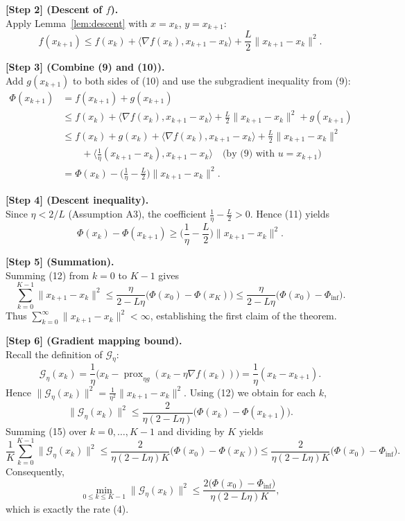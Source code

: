 \documentclass{article}
\newcommand{\prox}{\operatorname{prox}}
\newcommand{\grad}{\nabla}
\begin{document}
\bigskip
\noindent\textbf{[Step 2] (Descent of $f$).}\\
Apply Lemma~\ref{lem:descent} with $x=x_k$, $y=x_{k+1}$:
\[
f(x_{k+1})\le f(x_k)+\langle\grad f(x_k),x_{k+1}-x_k\rangle+\frac{L}{2}\|x_{k+1}-x_k\|^2.
\tag{10}
\]

\bigskip
\noindent\textbf{[Step 3] (Combine (9) and (10)).}\\
Add $g(x_{k+1})$ to both sides of (10) and use the subgradient inequality from (9):
\[
\begin{aligned}
\Phi(x_{k+1})
&=f(x_{k+1})+g(x_{k+1})\\
&\le f(x_k)+\langle\grad f(x_k),x_{k+1}-x_k\rangle+\frac{L}{2}\|x_{k+1}-x_k\|^2
   +g(x_{k+1})\\
&\le f(x_k)+g(x_k)+\Big\langle\grad f(x_k),x_{k+1}-x_k\Big\rangle
   +\frac{L}{2}\|x_{k+1}-x_k\|^2\\
&\qquad+\Big\langle\frac{1}{\eta}(x_{k+1}-x_k),x_{k+1}-x_k\Big\rangle
   \quad\text{(by (9) with $u=x_{k+1}$)}\\[2mm]
&= \Phi(x_k)-\Big(\frac{1}{\eta}-\frac{L}{2}\Big)\|x_{k+1}-x_k\|^2.
\end{aligned}
\tag{11}
\]

\bigskip
\noindent\textbf{[Step 4] (Descent inequality).}\\
Since $\eta<2/L$ (Assumption A3), the coefficient $\frac{1}{\eta}-\frac{L}{2}>0$. Hence (11) yields
\[
\Phi(x_k)-\Phi(x_{k+1})\ge\Big(\frac{1}{\eta}-\frac{L}{2}\Big)\|x_{k+1}-x_k\|^2.
\tag{12}
\]

\bigskip
\noindent\textbf{[Step 5] (Summation).}\\
Summing (12) from $k=0$ to $K-1$ gives
\[
\sum_{k=0}^{K-1}\|x_{k+1}-x_k\|^2
\le\frac{\eta}{2-L\eta}\bigl(\Phi(x_0)-\Phi(x_K)\bigr)
\le\frac{\eta}{2-L\eta}\bigl(\Phi(x_0)-\Phi_{\inf}\bigr).
\tag{13}
\]
Thus $\sum_{k=0}^{\infty}\|x_{k+1}-x_k\|^2<\infty$, establishing the first claim of the theorem.

\bigskip
\noindent\textbf{[Step 6] (Gradient mapping bound).}\\
Recall the definition of $\mathcal{G}_\eta$:
\[
\mathcal{G}_\eta(x_k)=\frac{1}{\eta}\bigl(x_k-\prox_{\eta g}(x_k-\eta\grad f(x_k))\bigr)
           =\frac{1}{\eta}(x_k-x_{k+1}).
\tag{14}
\]
Hence $\|\mathcal{G}_\eta(x_k)\|^2=\frac{1}{\eta^2}\|x_{k+1}-x_k\|^2$. Using (12) we obtain for each $k$,
\[
\|\mathcal{G}_\eta(x_k)\|^2
\le\frac{2}{\eta(2-L\eta)}\bigl(\Phi(x_k)-\Phi(x_{k+1})\bigr).
\tag{15}
\]
Summing (15) over $k=0,\dots,K-1$ and dividing by $K$ yields
\[
\frac{1}{K}\sum_{k=0}^{K-1}\|\mathcal{G}_\eta(x_k)\|^2
\le\frac{2}{\eta(2-L\eta)K}\bigl(\Phi(x_0)-\Phi(x_K)\bigr)
\le\frac{2}{\eta(2-L\eta)K}\bigl(\Phi(x_0)-\Phi_{\inf}\bigr).
\tag{16}
\]
Consequently,
\[
\min_{0\le k\le K-1}\|\mathcal{G}_\eta(x_k)\|^2
\le\frac{2\bigl(\Phi(x_0)-\Phi_{\inf}\bigr)}{\eta(2-L\eta)K},
\]
which is exactly the rate (4).
\end{document}
